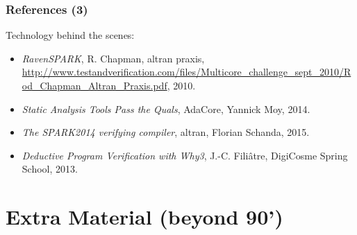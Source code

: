 \begin{frame}\frametitle{References (3)}
Technology behind the scenes:
{\scriptsize
  \begin{itemize}
  \item \emph{RavenSPARK}, R. Chapman, altran praxis, \url{http://www.testandverification.com/files/Multicore_challenge_sept_2010/Rod_Chapman_Altran_Praxis.pdf}, 2010.
  \item \emph{Static Analysis Tools Pass the Quals}, AdaCore, Yannick Moy, 2014.
  \item \emph{The SPARK2014 verifying compiler}, altran, Florian Schanda, 2015.
  \item \emph{Deductive Program Verification with Why3}, J.-C. Filiâtre, DigiCosme Spring School, 2013.
  \end{itemize}
}

\end{frame}


\section{Extra Material (beyond 90')}

